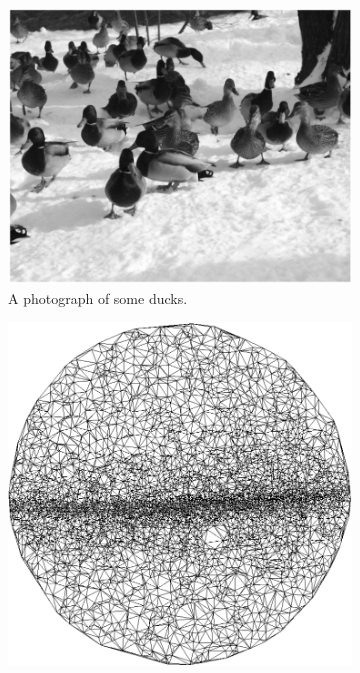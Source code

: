 \begin{figure}[h!]
    \centering
    \begin{subfigure}[t]{0.29\textwidth}
        \centering
        \captionsetup{justification=centering}
        \includegraphics[scale=0.25]{figures/fovealBefore}
        \caption{A photograph of some ducks.}
    \end{subfigure} \hfill%
    \begin{subfigure}[t]{0.29\textwidth}
        \centering
        \captionsetup{justification=centering}
        \includegraphics[scale=0.2]{figures/fovealMap}

\end{subfigure}
\end{figure}
